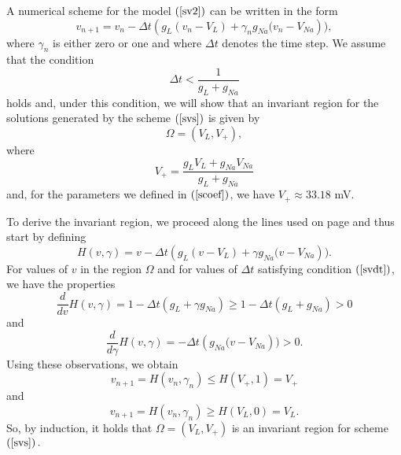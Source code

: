 A numerical scheme for the model $\left(  \ref{sv2}\right)  $ can be written
in the form%
\begin{equation}
v_{n+1}=v_{n}-\Delta t\left(  g_{L}\left(  v_{n}-V_{L}\right)  +\gamma
_{n}g_{Na}(v_{n}-V_{Na}\right)  ), \label{svs}%
\end{equation}
where $\gamma_{n}$ is either zero or one and where $\Delta t$ denotes the
time step. We assume that the condition%
\begin{equation}
\Delta t<\frac{1}{g_{L}+g_{Na}} \label{svdt}%
\end{equation}
holds and, under this condition, we will show that an invariant region for the solutions
generated by the scheme $\left(  \ref{svs}\right)  $ is given by%
\begin{equation}
\Omega=\left(  V_{L},V_{+}\right)  , \label{inv_region_2}%
\end{equation}
where%
\[
V_{+}=\frac{g_{L}V_{L}+g_{Na}V_{Na}}{g_{L}+g_{Na}}
\]
and, for the parameters we defined in $\left(  \ref{scoef}\right)  $, we have
$V_{+}\approx 33.18$ mV.

To derive the invariant region, we proceed along the lines used on
page \pageref{vdt} and thus start by defining%
\[
H(v,\gamma)=v-\Delta t\left(  g_{L}\left(  v-V_{L}\right)  +\gamma
g_{Na}(v-V_{Na}\right)  ).
\]
For values of $v$ in the region $\Omega$ and for values of $\Delta t$
satisfying condition $\left(  \ref{svdt}\right)$, we have the properties%
\[
\frac{d}{dv}H(v,\gamma)=1-\Delta t\left(  g_{L}+\gamma g_{Na}\right)
\geqslant1-\Delta t\left(  g_{L}+g_{Na}\right)  >0
\]
and%
\[
\frac{d}{d\gamma}H(v,\gamma)=-\Delta t\left(  g_{Na}(v-V_{Na}\right)  )>0.
\]
Using these observations, we obtain%
\[
v_{n+1}=H(v_{n},\gamma_{n})\leqslant H(V_{+},1)=V_{+}%
\]
and%
\[
v_{n+1}=H(v_{n},\gamma_{n})\geqslant H(V_{L},0)=V_{L}.
\]
So, by induction, it holds that $\Omega=\left(  V_{L},V_{+}\right)  $ is an
invariant region for scheme $\left(  \ref{svs}\right)  .$


